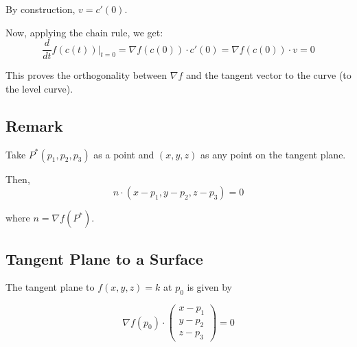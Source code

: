 \documentclass[11pt]{article}
\begin{document}
By construction, \(v = c'(0)\).

Now, applying the chain rule, we get:
\[
\frac{d}{dt} f(c(t)) \bigg|_{t=0} = \nabla f(c(0)) \cdot c'(0) = \nabla f(c(0)) \cdot v = 0
\]

This proves the orthogonality between \(\nabla f\) and the tangent vector to the curve (to the level curve).

\subsection*{Remark}
Take \(P^* (p_1, p_2, p_3)\) as a point and \((x, y, z)\) as any point on the tangent plane.

Then,
\[
n \cdot (x - p_1, y - p_2, z - p_3) = 0
\]

where \(n = \nabla f(P^*)\).

\subsection{Tangent Plane to a Surface}

The tangent plane to \( f(x, y, z) = k \) at \( p_0 \) is given by

\[
\nabla f(p_0) \cdot
\begin{pmatrix}
x - p_1 \\
y - p_2 \\
z - p_3
\end{pmatrix}
= 0
\]
\end{document}
